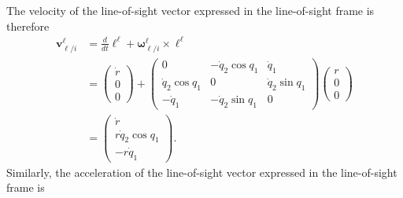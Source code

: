 \documentclass{article}
\newcommand{\vbf}{\mathbf{v}}
\newcommand{\ellbf}{\boldsymbol{\ell}}
\newcommand{\omegabf}{\boldsymbol{\omega}}
\begin{document}
The velocity of the line-of-sight vector expressed in the line-of-sight frame is therefore 
\begin{align*}
	\vbf_{\ell/i}^\ell &= \frac{d}{dt}\ellbf^\ell + 	\omegabf_{\ell/i}^{\ell} \times \ellbf^\ell \\
	&= \begin{pmatrix} \dot{r} \\ 0 \\ 0 \end{pmatrix} + \begin{pmatrix}
		0 & -\dot{q}_2\cos q_1 & \dot{q}_1 \\
		\dot{q}_2\cos q_1 & 0 & \dot{q}_2\sin q_1 \\
		-\dot{q}_1 & -\dot{q}_2\sin q_1 & 0
	   \end{pmatrix} \begin{pmatrix}r \\ 0 \\ 0 \end{pmatrix} \\
	&= \begin{pmatrix}
 	    \dot{r} \\
 	    r\dot{q}_2  \cos q_1 \\
 	    -r \dot{q}_1 
 	   \end{pmatrix}.
\end{align*}
Similarly, the acceleration of the line-of-sight vector expressed in the line-of-sight frame is 
\end{document}
